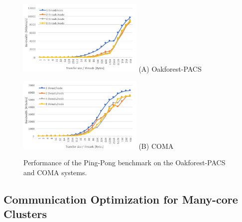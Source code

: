﻿\documentclass[graybox]{svmult}
\begin{document}
\begin{figure}[htbp]
\begin{minipage}{0.5\hsize}
\begin{center}
\includegraphics[bb=0 0 360 217, width=6cm]{./figure/FIG_OFP_PING_PONG.pdf}
\hspace{1.6cm} (A) Oakforest-PACS
\end{center}
\end{minipage}\begin{minipage}{0.5\hsize}
\begin{center}
\includegraphics[bb=0 0 360 217, width=6cm]{./figure/FIG_COMA_PING_PONG.pdf}
\hspace{1.6cm} (B) COMA
\end{center}
\end{minipage}
\caption{Performance of the Ping-Pong benchmark on the Oakforest-PACS and COMA systems.}
\label{FIG_PING_PONG}
\end{figure}

\subsection{Communication Optimization for Many-core Clusters} \label{SEC5}
\end{document}
